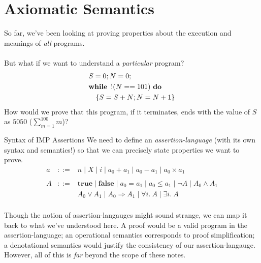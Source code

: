 \section{Axiomatic Semantics}

\begin{frame}
    So far, we've been looking at proving properties about the execution and
    meanings of \emph{all} programs.\\~\\
    \pause
    But what if we want to understand a \emph{particular} program?
    \pause
    \[\begin{aligned}
            &S = 0; N = 0; \\
            &\mathbf{while}\ \mathop{!} (N == 101)\ \mathbf{do}\\
            &\quad\{ S = S + N; N = N + 1 \}
        \end{aligned}\]
    \alert{How would we prove that this program, if it terminates, ends with
    the value of $S$ as $5050$ ($\sum_{m=1}^{100} m$)?}
\end{frame}

\begin{frame}{Syntax of IMP Assertions}
    We need to define an \emph{assertion-language} (with its own syntax and
    semantics!) so that we can precisely state properties we want to prove.
    \pause
    \[\begin{array}{rcl}
        a & ::= & n
                \mid X
                \mid i
                \mid a_0 + a_1
                \mid a_0 - a_1
                \mid a_0 \times a_1 \\
                \\
        A & ::= & \mathbf{true}
                \mid \mathbf{false}
                \mid a_0 = a_1
                \mid a_0 \leq a_1
                \mid \neg A
                \mid A_0 \wedge A_1 \\
             && A_0 \vee A_1
                \mid A_0 \Rightarrow A_1
                \mid \forall i.\ A
                \mid \exists i.\ A \\
    \end{array} \]
\end{frame}

Though the notion of assertion-langauges might sound strange, we can map it
back to what we've understood here. A proof would be a valid program in the
assertion-language; an operational semantics corresponds to proof
simplification; a denotational semantics would justify the consistency of our
assertion-langauge. However, all of this is \emph{far} beyond the scope of
these notes.

